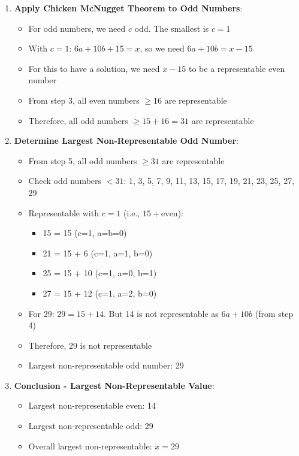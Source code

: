 \documentclass[12pt]{article}
\begin{document}
\begin{solutionbox}
\begin{enumerate}[leftmargin=*]
    \item \textbf{Apply Chicken McNugget Theorem to Odd Numbers}:
    \begin{itemize}
        \item For odd numbers, we need $c$ odd. The smallest is $c = 1$
        \item With $c = 1$: $6a + 10b + 15 = x$, so we need $6a + 10b = x - 15$
        \item For this to have a solution, we need $x - 15$ to be a representable even number
        \item From step 3, all even numbers $\geq 16$ are representable
        \item Therefore, all odd numbers $\geq 15 + 16 = 31$ are representable
    \end{itemize}
    
    \item \textbf{Determine Largest Non-Representable Odd Number}:
    \begin{itemize}
        \item From step 5, all odd numbers $\geq 31$ are representable
        \item Check odd numbers $< 31$: 1, 3, 5, 7, 9, 11, 13, 15, 17, 19, 21, 23, 25, 27, 29
        \item Representable with $c = 1$ (i.e., $15 + \text{even}$): 
        \begin{itemize}
            \item 15 = 15 (c=1, a=b=0)
            \item 21 = 15 + 6 (c=1, a=1, b=0)
            \item 25 = 15 + 10 (c=1, a=0, b=1)
            \item 27 = 15 + 12 (c=1, a=2, b=0)
        \end{itemize}
        \item For 29: $29 = 15 + 14$. But 14 is not representable as $6a + 10b$ (from step 4)
        \item Therefore, 29 is not representable
        \item Largest non-representable odd number: 29
    \end{itemize}
    
    \item \textbf{Conclusion - Largest Non-Representable Value}:
    \begin{itemize}
        \item Largest non-representable even: 14
        \item Largest non-representable odd: 29
        \item Overall largest non-representable: $x = 29$
    \end{itemize}
    

\end{enumerate}
\end{solutionbox}
\end{document}
